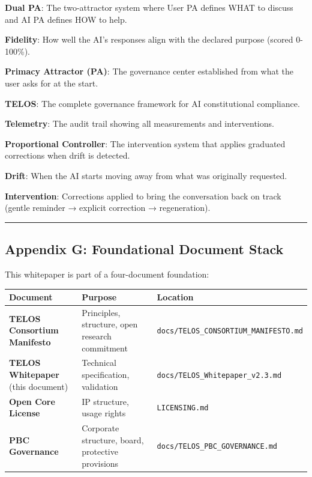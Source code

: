 \textbf{Dual PA}: The two-attractor system where User PA defines WHAT to
discuss and AI PA defines HOW to help.

\textbf{Fidelity}: How well the AI's responses align with the declared
purpose (scored 0-100\%).

\textbf{Primacy Attractor (PA)}: The governance center established from
what the user asks for at the start.

\textbf{TELOS}: The complete governance framework for AI constitutional
compliance.

\textbf{Telemetry}: The audit trail showing all measurements and
interventions.

\textbf{Proportional Controller}: The intervention system that applies
graduated corrections when drift is detected.

\textbf{Drift}: When the AI starts moving away from what was originally
requested.

\textbf{Intervention}: Corrections applied to bring the conversation
back on track (gentle reminder → explicit correction → regeneration).

\begin{center}\rule{0.5\linewidth}{0.5pt}\end{center}

\subsection{Appendix G: Foundational Document
Stack}\label{appendix-g-foundational-document-stack}

This whitepaper is part of a four-document foundation:

{\def\LTcaptype{none} %
\begin{longtable}[]{@{}
  >{\raggedright\arraybackslash}p{}
  >{\raggedright\arraybackslash}p{}
  >{\raggedright\arraybackslash}p{}@{}}
\toprule\noalign{}
\begin{minipage}[b]{\linewidth}\raggedright
Document
\end{minipage} & \begin{minipage}[b]{\linewidth}\raggedright
Purpose
\end{minipage} & \begin{minipage}[b]{\linewidth}\raggedright
Location
\end{minipage} \\
\midrule\noalign{}
\endhead
\bottomrule\noalign{}
\endlastfoot
\textbf{TELOS Consortium Manifesto} & Principles, structure, open
research commitment & \texttt{docs/TELOS\_CONSORTIUM\_MANIFESTO.md} \\
\textbf{TELOS Whitepaper} (this document) & Technical specification,
validation & \texttt{docs/TELOS\_Whitepaper\_v2.3.md} \\
\textbf{Open Core License} & IP structure, usage rights &
\texttt{LICENSING.md} \\
\textbf{PBC Governance} & Corporate structure, board, protective
provisions & \texttt{docs/TELOS\_PBC\_GOVERNANCE.md} \\
\end{longtable}
}


